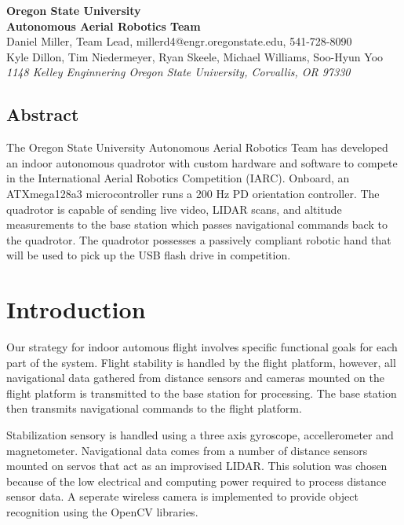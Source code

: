 \documentclass[12pt,letterpaper]{article}
\begin{document}
\begin{center}
{
    \bfseries\huge
    Oregon State University \\
    Autonomous Aerial Robotics Team \\ [1em]
}
{
    \small
    Daniel Miller, Team Lead, millerd4@engr.oregonstate.edu, 541-728-8090\\
	Kyle Dillon,  Tim Niedermeyer, Ryan Skeele, Michael Williams, Soo-Hyun Yoo \\ [0.5em]
    \emph{1148 Kelley Enginnering Oregon State University, Corvallis, OR 97330}
}
\end{center}

\begin{center}
\begin{minipage}{5.5in}

\section*{Abstract}

The Oregon State University Autonomous Aerial Robotics Team has developed an
indoor autonomous quadrotor with custom hardware and software to compete in the
International Aerial Robotics Competition (IARC). Onboard, an ATXmega128a3
microcontroller runs a 200 Hz PD orientation controller. The quadrotor is
capable of sending live video, LIDAR scans, and altitude measurements to the
base station which passes navigational commands back to the quadrotor. The
quadrotor possesses a passively compliant robotic hand that will be used to
pick up the USB flash drive in competition.

\end{minipage}
\end{center}


\section*{Introduction}

Our strategy for indoor automous flight involves specific functional goals for
each part of the system. Flight stability is handled by the flight platform,
however, all navigational data gathered from distance sensors and cameras
mounted on the flight platform is transmitted to the base station for
processing. The base station then transmits navigational commands to the flight
platform.

Stabilization sensory is handled using a three axis gyroscope, accellerometer
and magnetometer. Navigational data comes from a number of distance sensors
mounted on servos that act as an improvised LIDAR. This solution was chosen
because of the low electrical and computing power required to process distance
sensor data. A seperate wireless camera is implemented to provide object
recognition using the OpenCV libraries.
\end{document}
